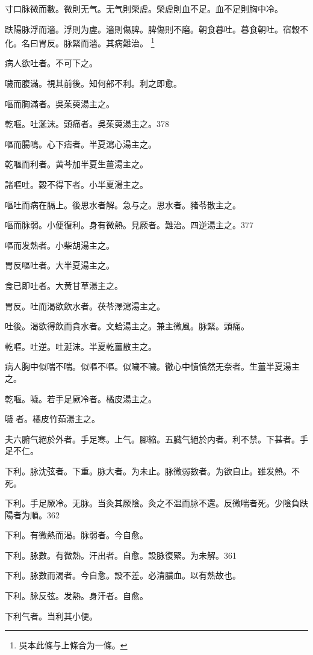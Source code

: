 寸口脉微而數。微則无气。无气則榮虗。榮虗則血不足。血不足則胸中冷。

趺陽脉浮而濇。浮則为虗。濇則傷脾。脾傷則不磨。朝食暮吐。暮食朝吐。宿穀不化。名曰胃反。脉緊而濇。其病難治。
	\footnote{吳本此條与上條合为一條。}

病人欲吐者。不可下之。

噦而腹滿。視其前後。知何部不利。利之即愈。

嘔而胸滿者。{\khaaitp 吳}茱萸湯主之。

乾嘔。吐涎沫。頭痛者。{\khaaitp 吳}茱萸湯主之。378

嘔而腸鳴。心下痞者。半夏瀉心湯主之。

乾嘔而利者。黄芩加半夏生薑湯主之。

諸嘔吐。穀不得下者。小半夏湯主之。

嘔吐而病在膈上。後思水者解。急与之。思水者。豬苓散主之。

嘔而脉弱。小便復利。身有微熱。見厥者。難治。四逆湯主之。377

嘔而发熱者。小柴胡湯主之。

胃反嘔吐者。大半夏湯主之。

食已即吐者。大黄甘草湯主之。

胃反。吐而渴欲飲水者。茯苓澤瀉湯主之。

吐後。渴欲得飲而貪水者。文蛤湯主之。兼主微風。脉緊。頭痛。

乾嘔。吐逆。吐涎沫。半夏乾薑散主之。

病人胸中似喘不喘。似嘔不嘔。似噦不噦。徹心中憒憒然无奈者。生薑半夏湯主之。

乾嘔。噦。若手足厥{\khaaitp 冷}者。橘皮湯主之。

噦{\sungtpii 𠱘}者。橘皮竹茹湯主之。

夫六腑气絕於外者。手足寒。上气。腳縮。五臓气絕於内者。利不禁。下甚者。手足不仁。

下利。脉沈弦者。下重。脉大者。为未止。脉微弱數者。为欲自止。雖发熱。不死。

下利。手足厥{\khaaitp 冷}。无脉。{\khaaitp 当灸其厥陰。}灸之不温{\khaaitp 而脉不還}。反微喘者死。少陰負趺陽者为順。362

下利。有微熱而渴。脉弱者。今自愈。

下利。脉數。有微熱。汗出者。自愈。設{\khaaitp 脉}復緊。为未解。361

下利。脉數而渴者。今自愈。設不差。必清膿血。以有熱故也。

下利。脉反弦。发熱。身汗者。自愈。

下利气者。当利其小便。

